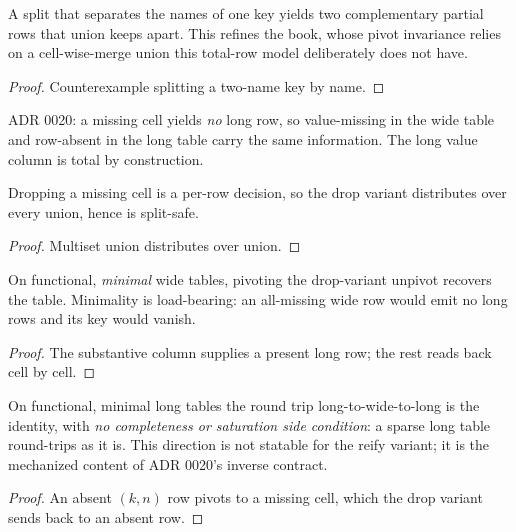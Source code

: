 \begin{theorem}
  \label{thm:pivot-not-splitinvariant}\leanok
  A split that separates the names of one key yields two complementary
  partial rows that union keeps apart.  This refines the book, whose
  pivot invariance relies on a cell-wise-merge union this total-row model
  deliberately does not have.
\end{theorem}
\begin{proof}\leanok
  Counterexample splitting a two-name key by name.
\end{proof}

\begin{definition}
  \label{def:unpivot-drop}\leanok
  ADR 0020: a missing cell yields \emph{no} long row, so value-missing
  in the wide table and row-absent in the long table carry the same
  information.  The long value column is total by construction.
\end{definition}

\begin{theorem}
  \label{thm:unpivotdrop-splitsafe}\leanok
  Dropping a missing cell is a per-row decision, so the drop variant
  distributes over every union, hence is split-safe.
\end{theorem}
\begin{proof}\leanok
  Multiset union distributes over union.
\end{proof}

\begin{theorem}
  \label{thm:pivot-unpivotdrop}\leanok
  On functional, \emph{minimal} wide tables, pivoting the drop-variant
  unpivot recovers the table.  Minimality is load-bearing: an
  all-missing wide row would emit no long rows and its key would vanish.
\end{theorem}
\begin{proof}\leanok
  The substantive column supplies a present long row; the rest reads
  back cell by cell.
\end{proof}

\begin{theorem}
  \label{thm:unpivotdrop-pivot}\leanok
  On functional, minimal long tables the round trip long-to-wide-to-long
  is the identity, with \emph{no completeness or saturation side
  condition}: a sparse long table round-trips as it is.  This direction
  is not statable for the reify variant; it is the mechanized content of
  ADR 0020's inverse contract.
\end{theorem}
\begin{proof}\leanok
  An absent $(k, n)$ row pivots to a missing cell, which the drop
  variant sends back to an absent row.
\end{proof}

